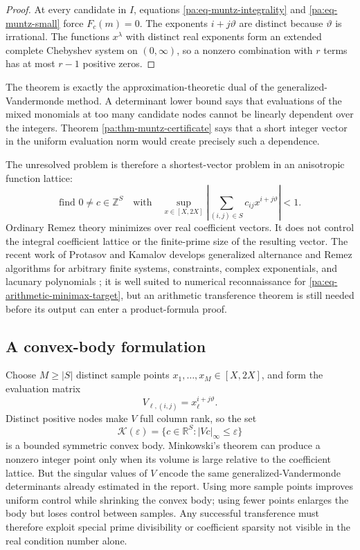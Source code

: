 \documentclass[11pt,oneside]{article}
\theoremstyle{definition}
\theoremstyle{remark}
\newcommand{\Z}{\mathbb Z}
\newcommand{\R}{\mathbb R}
\newcommand{\thetaq}{\vartheta}
\begin{document}
\begin{proof}
At every candidate in \(I\), equations \eqref{pa:eq-muntz-integrality} and
\eqref{pa:eq-muntz-small} force \(F_c(m)=0\).  The exponents \(i+j\thetaq\) are distinct
because \(\thetaq\) is irrational.  The functions \(x^\lambda\) with distinct real exponents
form an extended complete Chebyshev system on \((0,\infty)\), so a nonzero combination with
\(r\) terms has at most \(r-1\) positive zeros.
\end{proof}

The theorem is exactly the approximation-theoretic dual of the generalized-Vandermonde
method.  A determinant lower bound says that evaluations of the mixed monomials at too many
candidate nodes cannot be linearly dependent over the integers.  Theorem
\ref{pa:thm-muntz-certificate} says that a short integer vector in the uniform evaluation norm
would create precisely such a dependence.

The unresolved problem is therefore a shortest-vector problem in an anisotropic function
lattice:
\begin{equation}
 \text{find }0\ne c\in\Z^S
 \quad\text{with}\quad
 \sup_{x\in[X,2X]}
 \left|\sum_{(i,j)\in S}c_{ij}x^{i+j\thetaq}\right|<1.
 \label{pa:eq-arithmetic-minimax-target}
\end{equation}
Ordinary Remez theory minimizes over real coefficient vectors.  It does not control the
integral coefficient lattice or the finite-prime size of the resulting vector.  The recent
work of Protasov and Kamalov develops generalized alternance and Remez algorithms for arbitrary
finite systems, constraints, complex exponentials, and lacunary polynomials
\cite{ProtasovKamalov}; it is well suited to numerical reconnaissance for
\eqref{pa:eq-arithmetic-minimax-target}, but an arithmetic transference theorem is still
needed before its output can enter a product-formula proof.

\subsection{A convex-body formulation}

Choose \(M\ge |S|\) distinct sample points
\(x_1,\ldots,x_M\in[X,2X]\), and form the evaluation matrix
\[
 V_{\ell,(i,j)}=x_\ell^{i+j\thetaq}.
\]
Distinct positive nodes make \(V\) full column rank, so the set
\[
 \mathcal K(\varepsilon)=
 \{c\in\R^S:|Vc|_\infty\le\varepsilon\}
\]
is a bounded symmetric convex body.  Minkowski's theorem can produce a nonzero integer point
only when its volume is large relative to the coefficient lattice.  But the singular values of
\(V\) encode the same generalized-Vandermonde determinants already estimated in the report.
Using more sample points improves uniform control while shrinking the convex body; using fewer
points enlarges the body but loses control between samples.  Any successful transference must
therefore exploit special prime divisibility or coefficient sparsity not visible in the real
condition number alone.
\end{document}
